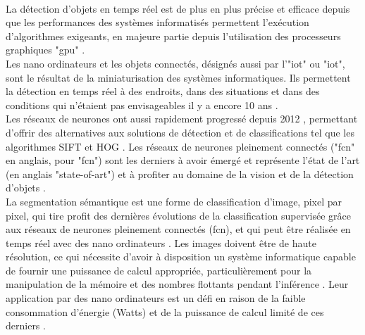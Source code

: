 \vspace{\baselineskip}
\\
\noindent La détection d'objets en temps réel est de plus en plus précise et efficace depuis que les performances des systèmes informatisés permettent l'exécution d'algorithmes exigeants, en majeure partie depuis l'utilisation des processeurs graphiques "\acrshort{gpu}" \parencite{chong_real-time_1992, dettmers_deep_2015, beam_deep_2017, jiaconda_concise_2019, zheng_real-time_2020, kurenkov_brief_2015}. 
\vspace{\baselineskip}
\\
\noindent Les nano ordinateurs et les objets connectés, désignés aussi par l'"\acrlong{iot}" ou "\acrshort{iot}", \parencite{blanco-filgueira_deep_2019, sharma_history_2019} sont le résultat de la miniaturisation des systèmes informatiques. Ils permettent la détection en temps réel à des endroits, dans des situations et dans des conditions qui n'étaient pas envisageables il y a encore 10 ans \parencite{zheng_real-time_2020, bernas_edge_2017, abouzahir_iot-empowered_2017, blanco-filgueira_deep_2019}.
\vspace{\baselineskip}
\\
\noindent Les réseaux de neurones ont aussi rapidement progressé depuis 2012 \parencite{beam_deep_2017}, permettant d'offrir des alternatives aux solutions de détection et de classifications tel que les algorithmes SIFT et HOG \parencite{pathak_architecturally_2019}. Les réseaux de neurones pleinement connectés ("\acrshort{fcn}" en anglais, pour "\acrlong{fcn}") sont les derniers à avoir émergé et représente l'état de l'art (en anglais "state-of-art") \parencite{zheng_real-time_2020} et à profiter au domaine de la vision et de la détection d'objets \parencite{nguyen_mavnet_2019, zheng_real-time_2020}.
\vspace{\baselineskip}
\\
\noindent La segmentation sémantique est une forme de classification d'image, pixel par pixel, qui tire profit des dernières évolutions de la classification supervisée grâce aux réseaux de neurones pleinement connectés (\acrshort{fcn}), et qui peut être réalisée en temps réel avec des nano ordinateurs \parencite{long_fully_2015, blanco-filgueira_deep_2019}. Les images doivent être de haute résolution, ce qui nécessite d'avoir à disposition un système informatique capable de fournir une puissance de calcul appropriée, particulièrement pour la manipulation de la mémoire et des nombres flottants pendant l'inférence \parencite{mody_low_2018}. Leur application par des nano ordinateurs est un défi en raison de la faible consommation d'énergie (Watts) et de la puissance de calcul limité de ces derniers \parencite{copel_whats_2016}.
